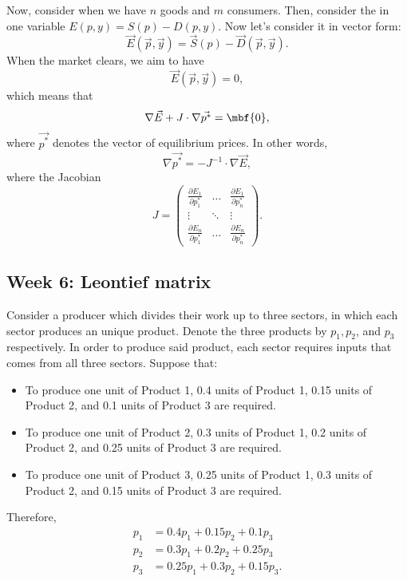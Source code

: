 \documentclass[a4paper, 12pt,oneside,openany]{book}
\begin{document}
Now, consider when we have $n$ goods and $m$ consumers. Then, consider the  in one variable $E(p, y) = S(p)-D(p, y).$ Now let's consider it in vector form: $$\vec{E}(\vec{p}, \vec{y}) = \vec{S}(p)-\vec{D}(\vec{p}, \vec{y}).$$ When the market clears, we aim to have $$\vec{E}(\vec{p}, \vec{y}) =0,$$ which means that $$\nabla \vec{E} +J\cdot \nabla \vec{p^{*}}=\mbf{0},$$ where $\vec{p^{*}}$ denotes the vector of equilibrium prices. In other words, $$\nabla \vec{p^{*}} =-J^{-1}\cdot \nabla \vec{E},$$ where the Jacobian $$J= \begin{pmatrix} \frac{\partial E_1}{\partial p_1^{*}} & \dots & \frac{\partial E_1}{\partial p_n^{*}} \\ \vdots & \ddots & \vdots \\ \frac{\partial E_n}{\partial p_1^{*}} & \dots & \frac{\partial E_n}{\partial p_n^{*}} \end{pmatrix}.$$

\subsection{Week 6: Leontief matrix}

Consider a producer which divides their work up to three sectors, in which each sector produces an unique product. Denote the three products by $p_1, p_2$, and $p_3$ respectively. In order to produce said product, each sector requires inputs that comes from all three sectors. Suppose that:

\begin{itemize}
	\item To produce one unit of Product 1, 0.4 units of Product 1, 0.15 units of Product 2, and 0.1 units of Product 3 are required.
	\item To produce one unit of Product 2, 0.3 units of Product 1, 0.2 units of Product 2, and 0.25 units of Product 3 are required.
	\item To produce one unit of Product 3, 0.25 units of Product 1, 0.3 units of Product 2, and 0.15 units of Product 3 are required.
\end{itemize}  

Therefore, \begin{align*} p_1&=0.4p_1+0.15p_2+0.1p_3 \\ p_2&=0.3p_1+0.2p_2+0.25p_3 \\ p_3&=0.25p_1+0.3p_2+0.15p_3.\end{align*}\
\end{document}
